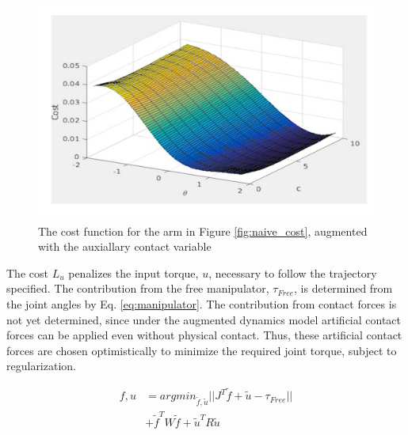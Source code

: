 \documentclass[../thesis.tex]{subfiles}
\begin{document}
\begin{figure}
  \centering
  \includegraphics[width=.7\linewidth]{./Planning/augmented_cost.png}
  \caption{The cost function for the arm in Figure \ref{fig:naive_cost}, augmented with the auxiallary contact variable}
  \label{fig:augmented_cost}
\end{figure}


The cost $L_u$ penalizes the input torque, $u$,  necessary to follow the trajectory specified.
The contribution from the free manipulator, $\tau_{Free}$, is determined from the joint angles by Eq. \ref{eq:manipulator}.
The contribution from contact forces is not yet determined, since under the augmented dynamics model artificial contact forces can be applied even without physical contact.
Thus, these artificial contact forces are chosen optimistically to minimize the required joint torque, subject to regularization. 


\begin{align}
f, u &= argmin_{\tilde{f}, \tilde{u}} ||J^T\tilde{f} + \tilde{u} - \tau_{Free}|| \\
&+ \tilde{f}^T W \tilde{f} + \tilde{u}^T R \tilde{u}
\end{align}
\end{document}
